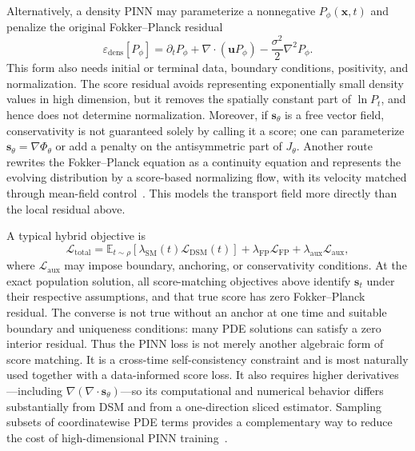 \documentclass[11pt]{article}
\newcommand{\vct}[1]{\bm{#1}}
\begin{document}
Alternatively, a density PINN may parameterize a nonnegative
\(P_{\phi}(\vct{x},t)\) and penalize the original Fokker--Planck residual
\begin{equation}
    \varepsilon_{\mathrm{dens}}[P_{\phi}]
    =\partial_t P_{\phi}
     +\nabla\cdot(\vct{u}P_{\phi})
     -\frac{\sigma^2}{2}\nabla^2P_{\phi}.
    \label{eq:density-fp-pinn-residual}
\end{equation}
This form also needs initial or terminal data, boundary conditions, positivity,
and normalization. The score residual avoids representing exponentially small
density values in high dimension, but it removes the spatially constant part
of \(\ln P_t\), and hence does not determine normalization. Moreover, if
\(\vct{s}_{\theta}\) is a free vector field, conservativity is not guaranteed
solely by calling it a score; one can parameterize
\(\vct{s}_{\theta}=\nabla\Phi_{\theta}\) or add a penalty on the antisymmetric
part of \(J_{\theta}\).
Another route rewrites the Fokker--Planck equation as a continuity equation
and represents the evolving distribution by a score-based normalizing flow,
with its velocity matched through mean-field control~\cite{zhou2025simulating}.
This models the transport field more directly than the local residual above.

A typical hybrid objective is
\begin{equation}
    \mathcal{L}_{\mathrm{total}}
    =\mathbb{E}_{t\sim\rho}\!\left[
      \lambda_{\mathrm{SM}}(t)\mathcal{L}_{\mathrm{DSM}}(t)\right]
     +\lambda_{\mathrm{FP}}\mathcal{L}_{\mathrm{FP}}
     +\lambda_{\mathrm{aux}}\mathcal{L}_{\mathrm{aux}},
    \label{eq:hybrid-score-fp-loss}
\end{equation}
where \(\mathcal{L}_{\mathrm{aux}}\) may impose boundary, anchoring, or
conservativity conditions. At the exact population solution, all score-matching
objectives above identify \(\vct{s}_t\) under their respective assumptions, and
that true score has zero Fokker--Planck residual. The converse is not true
without an anchor at one time and suitable boundary and uniqueness conditions:
many PDE solutions can satisfy a zero interior residual. Thus the PINN loss is
not merely another algebraic form of score matching. It is a cross-time
self-consistency constraint and is most naturally used together with a
data-informed score loss. It also requires higher derivatives---including
\(\nabla(\nabla\cdot\vct{s}_{\theta})\)---so its computational and numerical
behavior differs substantially from DSM and from a one-direction sliced
estimator. Sampling subsets of coordinatewise PDE terms provides a complementary
way to reduce the cost of high-dimensional PINN training~\cite{hu2023tackling}.
\end{document}
